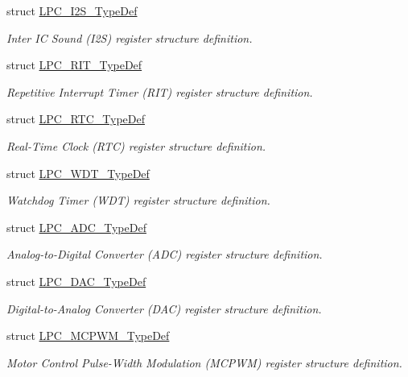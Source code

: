 \begin{DoxyCompactItemize}
struct \hyperlink{struct_l_p_c___i2_s___type_def}{\-L\-P\-C\-\_\-\-I2\-S\-\_\-\-Type\-Def}
\begin{DoxyCompactList}\small\item\em \-Inter \-I\-C \-Sound (\-I2\-S) register structure definition. \end{DoxyCompactList}\item 
struct \hyperlink{struct_l_p_c___r_i_t___type_def}{\-L\-P\-C\-\_\-\-R\-I\-T\-\_\-\-Type\-Def}
\begin{DoxyCompactList}\small\item\em \-Repetitive \-Interrupt \-Timer (\-R\-I\-T) register structure definition. \end{DoxyCompactList}\item 
struct \hyperlink{struct_l_p_c___r_t_c___type_def}{\-L\-P\-C\-\_\-\-R\-T\-C\-\_\-\-Type\-Def}
\begin{DoxyCompactList}\small\item\em \-Real-\/\-Time \-Clock (\-R\-T\-C) register structure definition. \end{DoxyCompactList}\item 
struct \hyperlink{struct_l_p_c___w_d_t___type_def}{\-L\-P\-C\-\_\-\-W\-D\-T\-\_\-\-Type\-Def}
\begin{DoxyCompactList}\small\item\em \-Watchdog \-Timer (\-W\-D\-T) register structure definition. \end{DoxyCompactList}\item 
struct \hyperlink{struct_l_p_c___a_d_c___type_def}{\-L\-P\-C\-\_\-\-A\-D\-C\-\_\-\-Type\-Def}
\begin{DoxyCompactList}\small\item\em \-Analog-\/to-\/\-Digital \-Converter (\-A\-D\-C) register structure definition. \end{DoxyCompactList}\item 
struct \hyperlink{struct_l_p_c___d_a_c___type_def}{\-L\-P\-C\-\_\-\-D\-A\-C\-\_\-\-Type\-Def}
\begin{DoxyCompactList}\small\item\em \-Digital-\/to-\/\-Analog \-Converter (\-D\-A\-C) register structure definition. \end{DoxyCompactList}\item 
struct \hyperlink{struct_l_p_c___m_c_p_w_m___type_def}{\-L\-P\-C\-\_\-\-M\-C\-P\-W\-M\-\_\-\-Type\-Def}
\begin{DoxyCompactList}\small\item\em \-Motor \-Control \-Pulse-\/\-Width \-Modulation (\-M\-C\-P\-W\-M) register structure definition. \end{DoxyCompactList}\item 

\end{DoxyCompactItemize}
